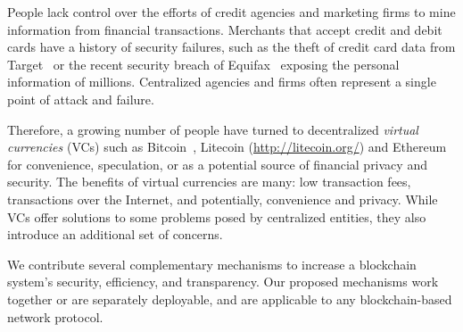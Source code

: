 People lack control over the
efforts of credit agencies and marketing firms to mine information
from financial transactions. Merchants that accept
credit and debit cards have a history of security  
failures, such as the theft of credit card data from Target~\cite{harris:2014,perlroth:2013} or the recent security breach of Equifax~\cite{equifax} exposing the personal information of millions. Centralized agencies and firms often represent a single point of attack and
 failure.

Therefore, a growing number of people have turned to decentralized {\em virtual
currencies} (VCs) such as Bitcoin~\cite{Nakamoto:2009},
Litecoin (\url{http://litecoin.org/}) and Ethereum~\cite{ETHASH} for convenience, speculation, 
or as a potential source of financial privacy and security. The benefits of virtual currencies are many: low transaction
fees, transactions over the Internet, and potentially, convenience and
privacy. While VCs offer solutions to some problems posed by centralized entities, they also introduce an additional set of concerns.

We contribute several complementary mechanisms to increase a blockchain system's security, efficiency, and transparency. Our proposed mechanisms work together or are separately deployable, and are applicable to any blockchain-based network protocol.

